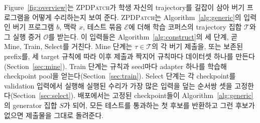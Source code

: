 \documentclass[10pt,conference]{IEEEtran}
\begin{document}
Figure~\ref{fig:overview}는 \textsc{ZPDPatch}가 학생 자신의 trajectory를 길잡이 삼아 버기 프로그램을 어떻게 수리하는지 보여 준다. \textsc{ZPDPatch}는 Algorithm~\ref{alg:generic}의 입력인 버기 프로그램 \(b\), 맥락 \(x\), 테스트 묶음 \(\mathcal E\)에 더해 학습 코퍼스의 trajectory 집합 \(\mathcal T\)와 그 실행 증거 \(\mathcal O\)를 받는다. 이 입력들은 Algorithm~\ref{alg:construct}의 세 단계, 곧 Mine, Train, Select를 거친다. Mine 단계는 \(\tau\in\mathcal T\)의 각 버기 제출을, 또는 보존된 prefix를, 세 target 규칙에 따라 이후 제출과 짝지어 규칙마다 데이터셋 하나를 만든다(Section~\ref{sec:mine}). Train 단계는 규칙과 seed마다 adapter 하나를 학습해 checkpoint pool을 얻는다(Section~\ref{sec:train}). Select 단계는 각 checkpoint를 validation 입력에서 실행해 실행된 수리가 가장 많은 입력을 덮는 순서쌍 셋을 고정한다(Section~\ref{sec:select}). 배포에서는 고정된 checkpoint들이 Algorithm~\ref{alg:generic}의 generator 집합 \(S\)가 되어, 모든 테스트를 통과하는 첫 후보를 반환하고 그런 후보가 없으면 제출물을 그대로 돌려준다.
\end{document}
